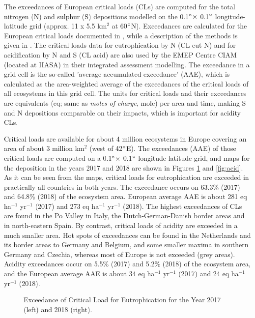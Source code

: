 The exceedances of European critical loads (CLs) are computed for the total nitrogen
(N) and sulphur (S) depositions modelled on the 0.1$^\circ \times$ 0.1$^\circ$
longitude-latitude grid (approx. 11 x 5.5 km$^{2}$ at 60$^\circ$N).
Exceedances are calculated for the European critical loads documented in \cite{Hettelingh:2017}, while
a description of the methods is given in \cite{DeVries:2015}. The
critical loads data for eutrophication by N (CL eut N) and for acidification by N and S
(CL acid) are also used by the EMEP Centre CIAM (located at IIASA) in their integrated assessment
modelling. The exceedance in a grid cell is the so-called ’average accumulated
exceedance’ (AAE), which is calculated as the area-weighted average of the
exceedances of the critical loads of all ecosystems in this grid cell. The units for
critical loads and their exceedances are equivalents (eq; same as \textit{moles of charge},
molc) per area and time, making S and N depositions comparable on their impacts, which is important for
acidity CLs.

Critical loads are available for about 4 million ecosystems in Europe covering an area
of about 3 million km$^{2}$ (west of 42$^\circ$E). The exceedances (AAE) of those critical loads
are computed on a 0.1$^\circ \times$ 0.1$^\circ$ longitude-latitude grid, and maps for the deposition in
the years 2017 and 2018 are shown in Figures \ref{fig:eutN} and \ref{fig:acid}. As it can be seen from
the maps, critical loads for eutrophication are exceeded in practically all countries in
both years. The exceedance occurs on 63.3\% (2017) and 64.8\% (2018) of the
ecosystem area. European average AAE is about 281 eq ha$^{-1}$ yr$^{-1}$ (2017) and 273 eq
ha$^{-1}$ yr$^{-1}$ (2018). The highest exceedances of CLs are found in the Po Valley in Italy, the
Dutch-German-Danish border areas and in north-eastern Spain.
By contrast, critical loads of acidity are exceeded in a much smaller area. Hot spots of
exceedances can be found in the Netherlands and its border areas to Germany and
Belgium, and some smaller maxima in southern Germany and Czechia,
whereas most of Europe is not exceeded (grey areas). Acidity exceedances occur
on 5.5\% (2017) and 5.2\% (2018) of the ecosystem area, and the European average
AAE is about 34 eq ha$^{-1}$ yr$^{-1}$ (2017) and 24 eq ha$^{-1}$ yr$^{-1}$ (2018).

\begin{figure}[ht]
  \centering
 \caption{Exceedance of Critical Load for Eutrophication for the Year 2017 (left) and 2018 (right).}
\label{fig:eutN}
\end{figure}

